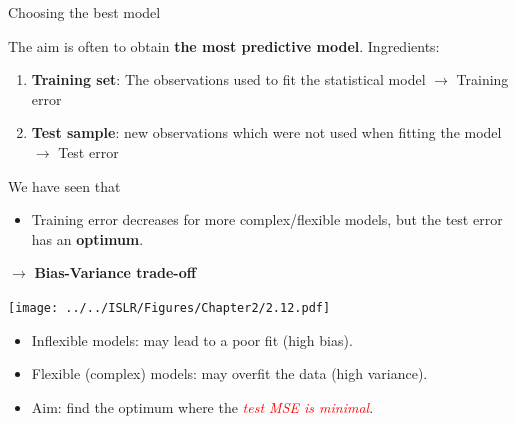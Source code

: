 \documentclass[
  ignorenonframetext,
]{beamer}
\providecommand{\tightlist}{%
  \setlength{\itemsep}{0pt}\setlength{\parskip}{0pt}}
\begin{document}
\begin{frame}
\begin{block}{Choosing the best model}
\protect\hypertarget{choosing-the-best-model}{}
\(~\)

The aim is often to obtain \textbf{the most predictive model}.
Ingredients:

\vspace{2mm}

\begin{enumerate}
\tightlist
\item
  \textbf{Training set}: The observations used to fit the statistical
  model \(\rightarrow\) Training error
\end{enumerate}

\vspace{2mm}

\begin{enumerate}
\setcounter{enumi}{1}
\tightlist
\item
  \textbf{Test sample}: new observations which were not used when
  fitting the model \(\rightarrow\) Test error
\end{enumerate}

\vspace{4mm}

We have seen that

\vspace{4mm}

\begin{itemize}
\tightlist
\item
  Training error decreases for more complex/flexible models, but the
  test error has an \textbf{optimum}.
\end{itemize}

\centering

\(\rightarrow\) \textbf{Bias-Variance trade-off}
\end{block}
\end{frame}

\begin{frame}
\texttt{[image: ../../ISLR/Figures/Chapter2/2.12.pdf]}

\begin{itemize}
\tightlist
\item
  Inflexible models: may lead to a poor fit (high bias).
\item
  Flexible (complex) models: may overfit the data (high variance).
\item
  Aim: find the optimum where the
  \emph{\textcolor{red}{test MSE is minimal}}.
\end{itemize}
\end{frame}
\end{document}
